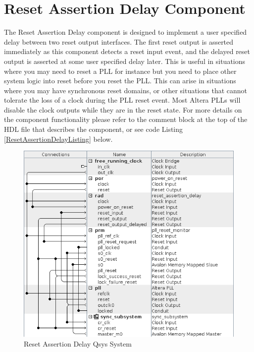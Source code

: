 \documentclass{article}
\begin{document}
\section*{Reset Assertion Delay Component}
\begin{flushleft}
\noindent
The Reset Assertion Delay component is designed to implement a user specified delay between two reset output interfaces.  The first reset output is asserted immediately as this component detects a reset input event, and the delayed reset output is asserted at some user specified delay later.  This is useful in situations where you may need to reset a PLL for instance but you need to place other system logic into reset before you reset the PLL.  This can arise in situations where you may have synchronous reset domains, or other situations that cannot tolerate the loss of a clock during the PLL reset event.  Most Altera PLLs will disable the clock outputs while they are in the reset state.  For more details on the component functionality please refer to the comment block at the top of the HDL file that describes the component, or see code Listing \ref{ResetAssertionDelayListing} below.

\begin{figure}[H]
\centering
\includegraphics[scale=0.675]{rad_qsys}
\caption{Reset Assertion Delay Qsys System}
\label{fig:rad_qsys}
\end{figure}


\end{flushleft}
\end{document}
